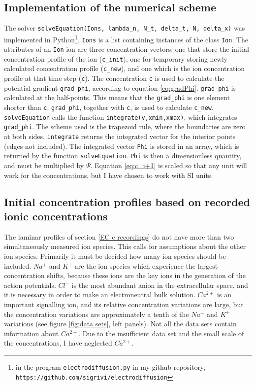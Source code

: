 \documentclass{article}
\begin{document}
\subsection{Implementation of the numerical scheme}
The solver \texttt{solveEquation(Ions, lambda\_n, N\_t, delta\_t, N, delta\_x)} was implemented in Python\footnote{ in the program \texttt{electrodiffusion.py} in my github repository, \texttt{https://github.com/sigrivi/electrodiffusion}}.  \texttt{Ions} is a list containing instances of the class \texttt{Ion}. The attributes of an \texttt{Ion} ion are three concentration vectors: one that store the initial concentration profile of the ion (\texttt{c\_{init}}), one for temporary storing newly calculated concentration profile (\texttt{c\_{new}}), and one which is the ion concentration profile at that time step (\texttt{c}). The concentration \texttt{c} is used to calculate the potential gradient \texttt{grad\_phi}, according to equation \ref{eq:gradPhi}. \texttt{grad\_phi} is calculated at the half-points. This means that the \texttt{grad\_phi} is one element shorter than \texttt{c}. \texttt{grad\_{phi}}, together with \texttt{c}, is used to calculate \texttt{c\_new}. \texttt{solveEquation} calls the function \texttt{integrate(v,xmin,xmax)}, which integrates \texttt{grad\_phi}. The scheme used is the trapezoid rule, where the boundaries are zero at both sides. \texttt{integrate} returns the integrated vector for the interior points (edges not included). The integrated vector \texttt{Phi} is stored in an array, which is returned by the function \texttt{solveEquation}. \texttt{Phi} is then a dimensionless quantity, and must be multiplied by $\Psi$. Equation \ref{eq:c_i+1} is scaled so that any unit will work for the concentrations, but I have chosen to work with SI units. 

\subsection{Initial concentration profiles based on recorded ionic concentrations}\label{Initial concentration profiles}
The laminar profiles of section \ref{EC c recordings} do not have more than two simultaneously measured ion species. This calls for assumptions about the other ion species. Primarily it must be decided how many ion species should be included. $Na^+$ and $K^+$ are the ion species which experience the largest concentration shifts, because these ions are the key ions in the generation of the action potentials. $Cl^-$ is the most abundant anion in the extracellular space, and it is necessary in order to make an electroneutral bulk solution. $Ca^{2+}$ is an important signalling ion, and its relative concentration variations are large, but the concentration variations are approximately a tenth of the $Na^+$ and $K^+$ variations (see figure \ref{fig:data sets}, left panels). Not all the data sets contain information about $Ca^{2+}$. Due to the insufficient data set and the small scale of the concentrations, I have neglected $Ca^{2+}$.  
\end{document}
